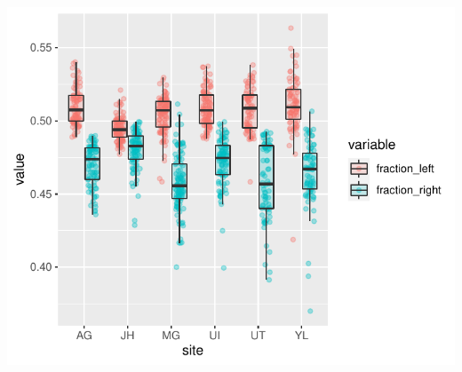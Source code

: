 \documentclass[
]{article}
\begin{document}
\begin{center}\includegraphics{paper_files/figure-latex/plot_hemi_late-1} \end{center}
\end{document}
